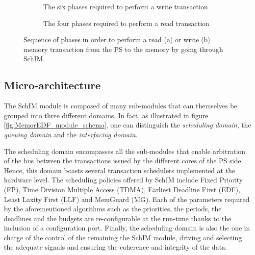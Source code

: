         \begin{figure}
            \begin{subfigure}{.5\textwidth}
                \centering
                
                \caption{The six phases required to perform a write transaction}
                \label{fig:Write_SchIM_communication_scheme}
            \end{subfigure}
            \par\bigskip
            \begin{subfigure}{.5\textwidth}
                \centering
                
                \caption{The four phases required to perform a read transaction}
                \label{fig:Read_SchIM_communication_scheme}
            \end{subfigure}
            \caption{Sequence of phases in order to perform a read (a) or write (b) memory transaction from the PS to the memory by going through SchIM.}
            \label{fig:SchIM_communication_scheme}
        \end{figure}

    \subsection{Micro-architecture}
        \label{subsec:micro-arch}
        The SchIM module is composed of many sub-modules that can themselves be grouped into three different domains. In fact, as illustrated in figure \ref{fig:MemorEDF_module_schema}, one can distinguish the \emph{scheduling domain}, the \emph{queuing domain} and the \emph{interfacing domain}.

        The scheduling domain encompasses all the sub-modules that enable arbitration of the bus between the transactions issued by the different cores of the PS side. Hence, this domain boasts several transaction schedulers implemented at the hardware level.
        The scheduling policies offered by SchIM include Fixed Priority (FP), Time Division Multiple Access (TDMA), Earliest Deadline First (EDF), Least Laxity First (LLF) and MemGuard (MG).
        Each of the parameters required by the aforementioned algorithms such as the priorities, the periods, the deadlines and the budgets are re-configurable at the run-time thanks to the inclusion of a configuration port.
        Finally, the scheduling domain is also the one in charge of the control of the remaining the SchIM module, driving and selecting the adequate signals and ensuring the coherence and integrity of the data.


